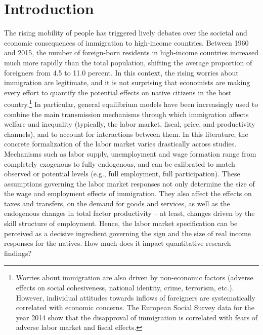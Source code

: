 \documentclass[a4paper,12pt]{article}
\begin{document}
\clearpage
\section{Introduction}

The rising mobility of people has triggered lively debates over the societal and economic consequences of immigration to high-income countries. Between 1960 and 2015, the number of foreign-born residents in high-income countries increased much more rapidly than the total population, shifting the average proportion of foreigners from 4.5 to 11.0 percent. In this context, the rising worries about immigration are legitimate, and it is not surprising that economists are making every effort to quantify the potential effects on native citizens in the host country.\footnote{Worries about immigration are also driven by non-economic factors (adverse effects on social cohesiveness, national identity, crime, terrorism, etc.). However, individual attitudes towards inflows of foreigners are systematically correlated with economic concerns. The European Social Survey data for the year 2014 show that the disapproval of immigration is correlated with fears of adverse labor market and fiscal effects.} In particular, general equilibrium models have been increasingly used to combine the main transmission mechanisms through which immigration affects welfare and inequality (typically, the labor market, fiscal, price, and productivity channels), and to account for interactions between them. In this literature, the concrete formalization of the labor market varies drastically across studies. Mechanisms such as labor supply, unemployment and wage formation range from completely exogenous to fully endogenous, and can be calibrated to match observed or potential levels (e.g., full employment, full participation). These assumptions governing the labor market responses not only determine the size of the wage and employment effects of immigration. They also affect the effects on taxes and transfers, on the demand for goods and services, as well as the endogenous changes in total factor productivity -- at least, changes driven by the skill structure of employment. Hence, the labor market specification can be perceived as a decisive ingredient governing the sign and the size of real income responses for the natives. How much does it impact quantitative research findings?
\end{document}
